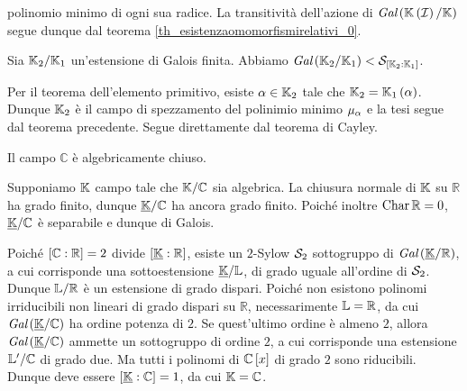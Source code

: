 polinomio minimo di ogni sua radice. La transitivit\`a dell'azione di
$\textit{Gal} \left ( \mathbb{K} \left ( \mathcal{I} \right )/\mathbb{K} \right )$ segue dunque
dal teorema \ref{th_esistenzaomomorfismirelativi_0}.
\EndProof
\begin{Corollary}
	Sia $\mathbb{K}_2/\mathbb{K}_1$ un'estensione di Galois
	finita.
	Abbiamo $\textit{Gal} \left ( \mathbb{K}_2/\mathbb{K}_1 \right ) <
	\mathcal{S}_{[\mathbb{K}_2:\mathbb{K}_1]}$.
\end{Corollary}
\Proof Per il teorema dell'elemento primitivo, esiste
$\alpha \in \mathbb{K}_2$ tale che
$\mathbb{K}_2 = \mathbb{K}_1 \left ( \alpha \right )$. Dunque $\mathbb{K}_2$ \`e
il campo di spezzamento  del polinimio minimo $\MinimalPolynomial{\alpha}$
e la tesi segue dal teorema precedente.
\EndProof
\Proof
Segue direttamente dal teorema di Cayley.
\EndProof
\begin{Theorem}
	 Il campo $\mathbb{C}$ \`e algebricamente chiuso.
\end{Theorem}
\Proof Supponiamo $\mathbb{K}$ campo tale che $\mathbb{K}/\mathbb{C}$ sia algebrica. La chiusura normale di $\mathbb{K}$ su $\mathbb{R}$ ha grado finito, dunque $\FieldExtension{\NormalClosure{\Field}}{\mathbb{C}}$ ha ancora grado finito. Poich\'e inoltre $\operatorname{Char}{\mathbb{R}} = 0$, $\FieldExtension{\NormalClosure{\Field}}{\mathbb{C}}$ \`e separabile e dunque di Galois.
\par Poich\'e $[\mathbb{C}:\mathbb{R}] = 2$ divide $\FieldDegree{\NormalClosure{\Field}}{\mathbb{R}}$, esiste un $2$-Sylow $\Sylow[2]$ sottogruppo di $\GaloisGroup{\NormalClosure{\Field}}{\mathbb{R}}$, a cui corrisponde una sottoestensione $\FieldExtension{\NormalClosure{\Field}}{\VarField}$, di grado uguale all'ordine di $\Sylow[2]$. Dunque $\mathbb{L}/\mathbb{R}$ \`e un estensione di grado dispari. Poich\'e non esistono polinomi irriducibili non lineari di grado dispari su $\mathbb{R}$, necessarimente $\mathbb{L} = \mathbb{R}$, da cui $\GaloisGroup{\NormalClosure{\Field}}{\mathbb{C}}$ ha ordine potenza di $2$. Se quest'ultimo ordine \`e almeno $2$, allora $\GaloisGroup{\NormalClosure{\Field}}{\mathbb{C}}$ ammette un sottogruppo di ordine $2$, a cui corrisponde una estensione $\mathbb{L}'/\mathbb{C}$ di grado due. Ma tutti i polinomi di $\mathbb{C} \left [ x \right ]$ di grado $2$ sono riducibili. Dunque deve essere $\FieldDegree{\NormalClosure{\Field}}{\mathbb{C}} = 1$, da cui $\mathbb{K} = \mathbb{C}$. \EndProof

